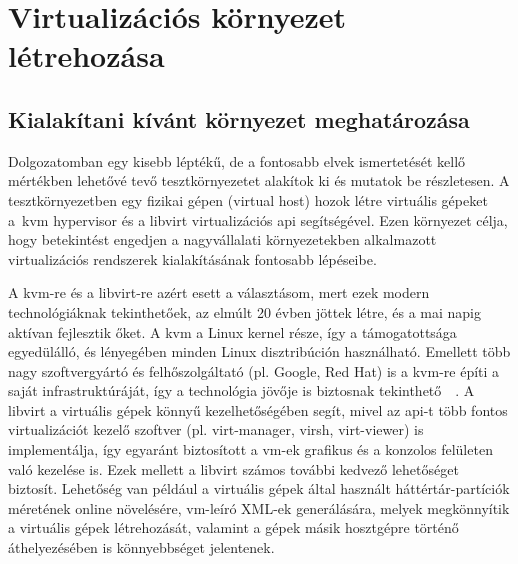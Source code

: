 
\chapter{Virtualizációs környezet létrehozása}
\label{chap:testenv}

\section{Kialakítani kívánt környezet meghatározása}
Dolgozatomban egy kisebb léptékű, de a fontosabb elvek ismertetését kellő mértékben lehetővé tevő tesztkörnyezetet alakítok ki és mutatok be részletesen. A tesztkörnyezetben egy fizikai gépen (virtual host) hozok létre virtuális gépeket a~\acrshort{kvm} \gls{hypervisor} és a \gls{libvirt} virtualizációs \acrshort{api} segítségével. Ezen környezet célja, hogy betekintést engedjen a nagyvállalati környezetekben alkalmazott virtualizációs rendszerek kialakításának fontosabb lépéseibe.

A \acrshort{kvm}-re és a \gls{libvirt}-re azért esett a választásom, mert ezek modern technológiáknak tekinthetőek, az elmúlt 20 évben jöttek létre, és a mai napig aktívan fejlesztik őket. A \acrshort{kvm} a Linux kernel része, így a támogatottsága egyedülálló, és lényegében minden Linux disztribúción használható. Emellett több nagy szoftvergyártó és felhőszolgáltató (pl. Google, Red Hat) is a \acrshort{kvm}-re építi a saját infrastruktúráját, így a technológia jövője is biztosnak tekinthető~\cite{RedHatVirtKVM}~\cite{GoogleCloudKVM}. A \gls{libvirt} a virtuális gépek könnyű kezelhetőségében segít, mivel az \acrshort{api}-t több fontos virtualizációt kezelő szoftver (pl. virt-manager, virsh, virt-viewer) is implementálja, így egyaránt biztosított a \acrshort{vm}-ek grafikus és a konzolos felületen való kezelése is.
Ezek mellett a \gls{libvirt} számos további kedvező lehetőséget biztosít. Lehetőség van például a virtuális gépek által használt háttértár-partíciók méretének online növelésére, \acrshort{vm}-leíró XML-ek generálására, melyek megkönnyítik a virtuális gépek létrehozását, valamint a gépek másik hosztgépre történő áthelyezésében is könnyebbséget jelentenek.

